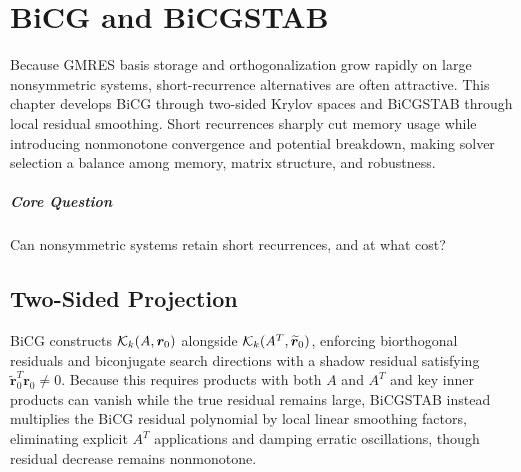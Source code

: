 \chapter{BiCG and BiCGSTAB}\label{v0ch:14}
\begin{chaptersummary}
Because GMRES basis storage and orthogonalization grow rapidly on large nonsymmetric systems, short-recurrence alternatives are often attractive. This chapter develops BiCG through two-sided Krylov spaces and BiCGSTAB through local residual smoothing. Short recurrences sharply cut memory usage while introducing nonmonotone convergence and potential breakdown, making solver selection a balance among memory, matrix structure, and robustness.
\end{chaptersummary}
\paragraph{Core Question}Can nonsymmetric systems retain short recurrences, and at what cost?

\section{Two-Sided Projection}
BiCG constructs $\mathcal K_k(A,\bm r_0)$ alongside $\mathcal K_k(A^T,\widetilde{\bm r}_0)$, enforcing biorthogonal residuals and biconjugate search directions with a shadow residual satisfying $\widetilde{\bm r}_0^T\bm r_0\ne0$. Because this requires products with both $A$ and $A^T$ and key inner products can vanish while the true residual remains large, BiCGSTAB instead multiplies the BiCG residual polynomial by local linear smoothing factors, eliminating explicit $A^T$ applications and damping erratic oscillations, though residual decrease remains nonmonotone.
